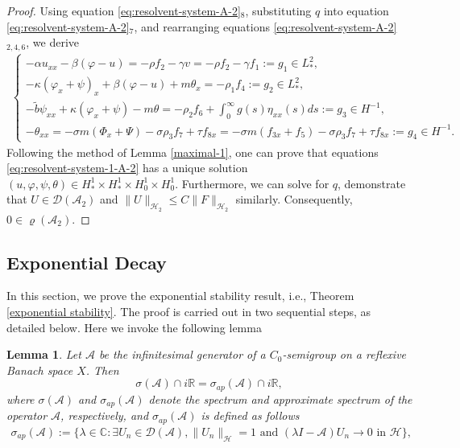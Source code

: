 \documentclass[11pt,reqno]{article}
\newtheorem{lemma}[theorem]{Lemma}
\newcommand{\dt}{\tilde}
\begin{document}
\begin{proof}
	Using equation \eqref{eq:resolvent-system-A-2}$_8$, substituting $q$ into equation \eqref{eq:resolvent-system-A-2}$_7$, and rearranging equations \eqref{eq:resolvent-system-A-2}$_{2,4,6}$, we derive
	\begin{align}\label{eq:resolvent-system-1-A-2}
		\begin{cases}
			-\alpha u_{xx} - \beta(\varphi - u) = -\rho f_2 - \gamma v=-\rho f_2 - \gamma f_1 := g_1 \in L_*^2, \\
			-\kappa(\varphi_x + \psi)_x + \beta(\varphi - u) + m\theta_x = -\rho_1 f_4 := g_2 \in L_*^2, \\
			- \dt b \psi_{xx} + \kappa(\varphi_x + \psi) - m\theta = -\rho_2 f_6 +  \int_0^\infty g(s) \eta_{xx}(s) ds  := g_3 \in H^{-1}, \\
			- \theta_{xx} = - \sigma m(\Phi_x + \Psi) - \sigma \rho_3 f_7 + \tau f_{8x}=- \sigma m(f_{3x} + f_5) - \sigma \rho_3 f_7 + \tau f_{8x}:=g_4 \in H^{-1}.
		\end{cases}
	\end{align}
	Following the method of Lemma \ref{maximal-1}, one can prove that equations \eqref{eq:resolvent-system-1-A-2}  has a unique solution $(u,\varphi,\psi,\theta) \in H_*^1 \times H_*^1 \times H_0^1 \times H_0^1$. Furthermore, we can solve for
	$q$, demonstrate that $U \in \mathcal{D}(\mathcal{A}_2)$ and $\|U\|_{\mathcal{H}_2} \leq C\|F\|_{\mathcal{H}_2}$ similarly. Consequently, $0 \in \varrho(\mathcal{A}_2)$.
\end{proof}

\subsection{Exponential Decay} \label{sec3.2}
In this section, we prove the exponential stability result, i.e., Theorem \ref{exponential stability}. The proof is carried out in two sequential steps, as detailed below. Here we invoke the following lemma

\begin{lemma}\label{Thm:SpectralApprox}\cite{MR933321}
	Let $\mathcal{A}$ be the infinitesimal generator of a $C_0$-semigroup on a reflexive Banach space $X$. Then
	$$
	\sigma(\mathcal{A}) \cap i\mathbb{R} = \sigma_{ap}(\mathcal{A}) \cap i\mathbb{R},
	$$
	where $\sigma(\mathcal{A})$ and $\sigma_{ap}(\mathcal{A})$ denote the spectrum and approximate spectrum of the operator $\mathcal{A}$, respectively, and $\sigma_{ap}(\mathcal{A})$ is defined as follows
\begin{align}\label{defapp}
	\sigma_{ap}(\mathcal{A}):= \{ \lambda \in \mathbb{C}: \exists U_{n} \in \mathcal{D}(\mathcal{A}), \|U_{n}\|_{\mathcal{H}} = 1 \text{ and } (\lambda I - \mathcal{A})U_{n} \to 0 \text{ in } \mathcal{H}\},
\end{align}
\end{lemma}
\end{document}
